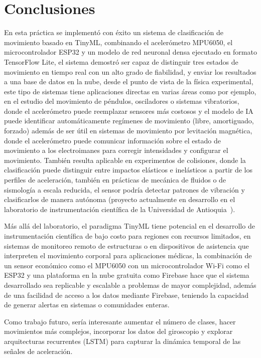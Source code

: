 \documentclass[conference]{IEEEtran}
\begin{document}
\section{Conclusiones}

En esta práctica se implementó con éxito un sistema de clasificación de movimiento basado en TinyML, combinando el acelerómetro MPU6050, el microcontrolador ESP32 y un modelo de red neuronal densa ejecutado en formato TensorFlow Lite, el sistema demostró ser capaz de distinguir tres estados de movimiento en tiempo real con un alto grado de fiabilidad, y enviar los resultados a una base de datos en la nube, desde el punto de vista de la física experimental, este tipo de sistemas tiene aplicaciones directas en varias áreas como por ejemplo, en el estudio del movimiento de péndulos, osciladores o sistemas vibratorios, donde el acelerómetro puede reemplazar sensores más costosos y el modelo de IA puede identificar automáticamente regímenes de movimiento (libre, amortiguado, forzado) además de ser útil en sistemas de movimiento por levitación magnética, donde el acelerómetro puede comunicar información sobre el estado de movimiento a los electroimanes para corregir intensidades y configurar el movimiento. También resulta aplicable en experimentos de colisiones, donde la clasificación puede distinguir entre impactos elásticos e inelásticos a partir de los perfiles de aceleración, también en prácticas de mecánica de fluidos o de sismología a escala reducida, el sensor podría detectar patrones de vibración y clasificarlos de manera autónoma (proyecto actualmente en desarrollo en el laboratorio de instrumentación científica de la Universidad de Antioquia~\cite{pinpacho2025}).

Más allá del laboratorio, el paradigma TinyML tiene potencial en el desarrollo de instrumentación científica de bajo costo para regiones con recursos limitados, en sistemas de monitoreo remoto de estructuras o en dispositivos de asistencia que interpreten el movimiento corporal para aplicaciones médicas, la combinación de un sensor económico como el MPU6050 con un microcontrolador Wi-Fi como el ESP32 y una plataforma en la nube gratuita como Firebase hace que el sistema desarrollado sea replicable y escalable a problemas de mayor complejidad, además de una facilidad de acceso a los datos mediante Firebase, teniendo la capacidad de generar alertas en sistemas o comunidades enteras.

Como trabajo futuro, sería interesante aumentar el número de clases, hacer movimientos más complejos, incorporar los datos del giroscopio y explorar arquitecturas recurrentes (LSTM) para capturar la dinámica temporal de las señales de aceleración.



\end{document}
